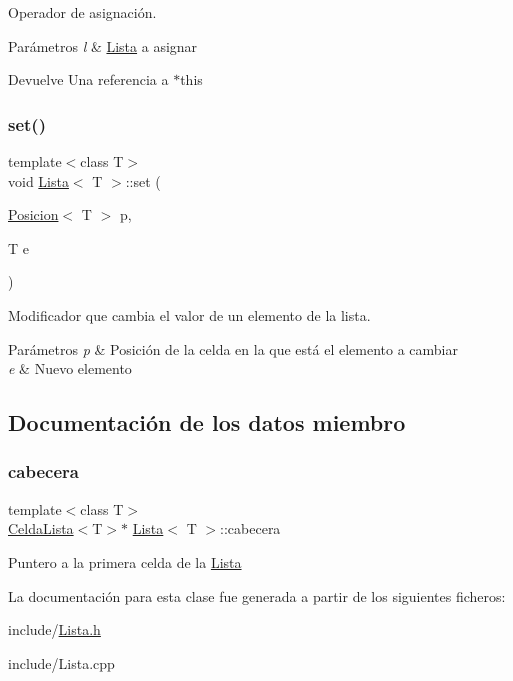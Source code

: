 Operador de asignación. 


\begin{DoxyParams}{Parámetros}
{\em l} & \mbox{\hyperlink{classLista}{Lista}} a asignar \\
\hline
\end{DoxyParams}
\begin{DoxyReturn}{Devuelve}
Una referencia a $\ast$this 
\end{DoxyReturn}
\mbox{\label{classLista_a7d225f26b4490809aa92bcfd44661c12}} 
\subsubsection{\texorpdfstring{set()}{set()}}
{\footnotesize\ttfamily template$<$class T$>$ \\
void \mbox{\hyperlink{classLista}{Lista}}$<$ T $>$\+::set (\begin{DoxyParamCaption}\item[{\mbox{\hyperlink{classPosicion}{Posicion}}$<$ T $>$}]{p,  }\item[{T}]{e }\end{DoxyParamCaption})}



Modificador que cambia el valor de un elemento de la lista. 


\begin{DoxyParams}{Parámetros}
{\em p} & Posición de la celda en la que está el elemento a cambiar \\
\hline
{\em e} & Nuevo elemento \\
\hline
\end{DoxyParams}


\subsection{Documentación de los datos miembro}
\mbox{\label{classLista_a2d0dd8c80abfa1bee249300e2f903f03}} 
\subsubsection{\texorpdfstring{cabecera}{cabecera}}
{\footnotesize\ttfamily template$<$class T$>$ \\
\mbox{\hyperlink{structCeldaLista}{Celda\+Lista}}$<$T$>$$\ast$ \mbox{\hyperlink{classLista}{Lista}}$<$ T $>$\+::cabecera\hspace{0.3cm}{\ttfamily [private]}}

Puntero a la primera celda de la \mbox{\hyperlink{classLista}{Lista}} 

La documentación para esta clase fue generada a partir de los siguientes ficheros\+:\begin{DoxyCompactItemize}
\item 
include/\mbox{\hyperlink{Lista_8h}{Lista.\+h}}\item 
include/Lista.\+cpp\end{DoxyCompactItemize}
